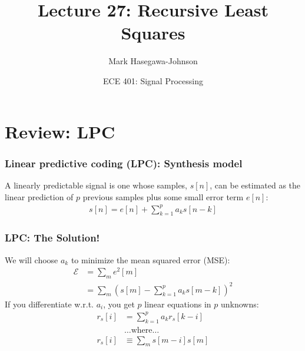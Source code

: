 \documentclass{beamer}
\title{Lecture 27: Recursive Least Squares}
\author{Mark Hasegawa-Johnson}
\date{ECE 401: Signal Processing}
\begin{document}
\begin{frame}
  \maketitle
\end{frame}

\begin{frame}
  \tableofcontents
\end{frame}


\section[LPC]{Review: LPC}

\begin{frame}
  \frametitle{Linear predictive coding (LPC): Synthesis model}

  A linearly predictable signal is one whose samples, $s[n]$, can be estimated
  as the linear prediction of $p$ previous samples plus some small error term $e[n]$:
  \begin{align*}
    s[n] = e[n]+\sum_{k=1}^p a_k s[n-k]
  \end{align*}
\end{frame}

\begin{frame}
  \frametitle{LPC: The Solution!}

  We will choose $a_k$ to minimize the mean squared error (MSE):
  \begin{align*}
    \mathcal{E} &= \sum_m e^2[m]\\
    &= \sum_m \left(s[m]-\sum_{k=1}^p a_ks[m-k]\right)^2
  \end{align*}
  If you differentiate w.r.t. $a_i$, you get $p$ linear equations in
  $p$ unknowns:
  \begin{align*}
    r_s[i] &= \sum_{k=1}^p a_kr_s[k-i]\\
    &\text{\ldots where\ldots}\\
    r_s[i] &\equiv \sum_m s[m-i]s[m] 
  \end{align*}

\end{frame}
\end{document}
